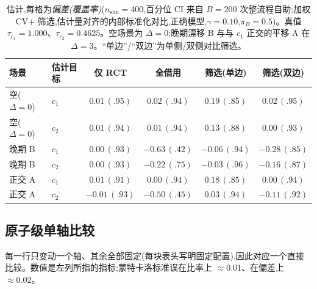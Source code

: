 \documentclass[11pt]{article}
\begin{document}
\begin{table}[ht]
\centering
\caption{估计,每格为\emph{偏差(覆盖率)}($n_{\mathrm{sim}}=400$,百分位 CI 来自 $B=200$ 次整流程自助;加权 CV+ 筛选,估计量对齐的内部标准化对比,正确模型,$\gamma=0.10$,$\pi_B=0.5$)。真值 $\tau_{c_1}=1.000$、$\tau_{c_2}=0.4625$。空场景为 $\Delta=0$;晚期漂移 B 与与 $c_1$ 正交的平移 A 在 $\Delta=3$。``单边''/``双边''为单侧/双侧对比筛选。}
\begin{tabular}{llcccc}
\toprule
场景 & 估计目标 & 仅 RCT & 全借用 & 筛选(单边) & 筛选(双边) \\
\midrule
空($\Delta{=}0$) & $c_1$ & $0.01\,(.95)$ & $0.02\,(.94)$ & $0.19\,(.85)$ & $0.02\,(.95)$ \\
空($\Delta{=}0$) & $c_2$ & $0.01\,(.94)$ & $0.01\,(.94)$ & $0.13\,(.88)$ & $0.00\,(.93)$ \\
晚期 B & $c_1$ & $0.00\,(.93)$ & $-0.63\,(.42)$ & $-0.06\,(.94)$ & $-0.28\,(.85)$ \\
晚期 B & $c_2$ & $0.00\,(.93)$ & $-0.22\,(.75)$ & $-0.03\,(.96)$ & $-0.16\,(.87)$ \\
正交 A & $c_1$ & $0.01\,(.91)$ & $0.00\,(.94)$ & $0.18\,(.85)$ & $0.00\,(.94)$ \\
正交 A & $c_2$ & $-0.01\,(.93)$ & $-0.50\,(.45)$ & $0.03\,(.94)$ & $-0.11\,(.92)$ \\
\bottomrule
\end{tabular}
\label{tab:estplaceholder}
\end{table}

\subsection{原子级单轴比较}

每一行只变动一个轴、其余全部固定(每块表头写明固定配置),因此对应一个直接比较。数值是左列所指的指标;蒙特卡洛标准误在比率上 $\approx 0.01$、在偏差上 $\approx 0.02$。
\end{document}
